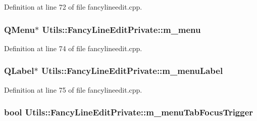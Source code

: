 \-Definition at line 72 of file fancylineedit.\-cpp.

\hypertarget{class_utils_1_1_fancy_line_edit_private_a49c75a34391e9c7eb95f8d2db3629938}{
\subsubsection[{m\-\_\-menu}]{\setlength{\rightskip}{0pt plus 5cm}\-Q\-Menu$\ast$ {\bf \-Utils\-::\-Fancy\-Line\-Edit\-Private\-::m\-\_\-menu}}}\label{class_utils_1_1_fancy_line_edit_private_a49c75a34391e9c7eb95f8d2db3629938}


\-Definition at line 74 of file fancylineedit.\-cpp.

\hypertarget{class_utils_1_1_fancy_line_edit_private_af0626a7a7714a1a52ca2de3284baa07e}{
\subsubsection[{m\-\_\-menu\-Label}]{\setlength{\rightskip}{0pt plus 5cm}\-Q\-Label$\ast$ {\bf \-Utils\-::\-Fancy\-Line\-Edit\-Private\-::m\-\_\-menu\-Label}}}\label{class_utils_1_1_fancy_line_edit_private_af0626a7a7714a1a52ca2de3284baa07e}


\-Definition at line 75 of file fancylineedit.\-cpp.

\hypertarget{class_utils_1_1_fancy_line_edit_private_a9db3d32157258337faed26134c440674}{
\subsubsection[{m\-\_\-menu\-Tab\-Focus\-Trigger}]{\setlength{\rightskip}{0pt plus 5cm}bool {\bf \-Utils\-::\-Fancy\-Line\-Edit\-Private\-::m\-\_\-menu\-Tab\-Focus\-Trigger}}}\label{class_utils_1_1_fancy_line_edit_private_a9db3d32157258337faed26134c440674}


